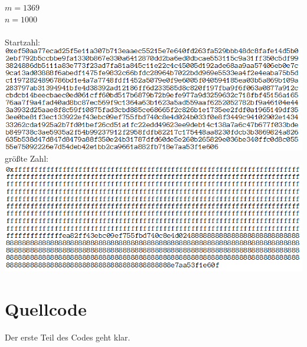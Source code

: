 \documentclass[a4paper,10pt,ngerman]{scrartcl}
\begin{document}
$m=1369$
\\
$n=1000$
\\
\\
Startzahl: 
\\
\includegraphics[width=\textwidth]{solutions/startzahl5.png} 
\\
größte Zahl:
\\
\includegraphics[width=\textwidth]{solutions/endzahl5.png} 




\section{Quellcode}

Der erste Teil des Codes geht klar.
\end{document}
